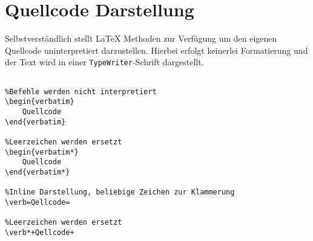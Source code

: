 \chapter{Quellcode Darstellung}
Selbstverständlich stellt \LaTeX{} Methoden zur Verfügung um den eigenen Quellcode uninterpretiert darzustellen. Hierbei erfolgt keinerlei Formatierung und der Text wird in einer \texttt{TypeWriter}-Schrift dargestellt.
\begin{lstlisting}[caption={Verbatim (Befehle)}]

%Befehle werden nicht interpretiert
\begin{verbatim}
	Quellcode
\end{verbatim}

%Leerzeichen werden ersetzt
\begin{verbatim*}
	Quellcode
\end{verbatim*}

%Inline Darstellung, beliebige Zeichen zur Klammerung
\verb=Qellcode=

%Leerzeichen werden ersetzt
\verb*+Qellcode+

\end{lstlisting}